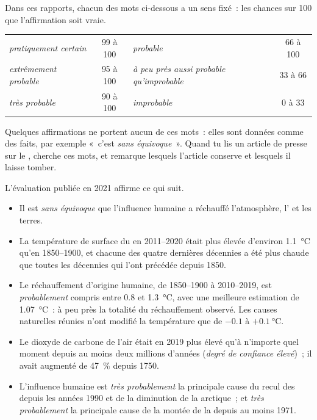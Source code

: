 Dans ces rapports, chacun des mots ci-dessous a un sens fixé~: les
chances sur 100 que l'affirmation soit vraie.

\begin{center}
{\small
\begin{tabular}{|l|c||l|c|}
\hline
\emph{pratiquement certain} & 99 à 100 & \emph{probable} & 66 à 100 \\
\emph{extrêmement probable} & 95 à 100 & \emph{à peu près aussi probable qu'improbable} & 33 à 66 \\
\emph{très probable} & 90 à 100 & \emph{improbable} & 0 à 33 \\
\hline
\end{tabular}}
\end{center}

\noindent Quelques affirmations ne portent aucun de ces mots~: elles sont
données comme des faits, par exemple «~c'est \emph{sans équivoque}~».
Quand tu lis un article de presse sur le , cherche ces mots, et
remarque lesquels l'article conserve et lesquels il laisse tomber.

L'évaluation publiée en 2021 affirme ce qui suit.
\begin{itemize}
  \item Il est \emph{sans équivoque} que l'influence humaine a réchauffé
        l'atmosphère, l' et les terres.
  \item La température de surface du  en 2011--2020 était plus élevée
        d'environ \qty{1.1}{\degreeCelsius} qu'en 1850--1900, et chacune
        des quatre dernières décennies a été plus chaude que toutes les
        décennies qui l'ont précédée depuis 1850.
  \item Le réchauffement d'origine humaine, de 1850--1900 à 2010--2019, est
        \emph{probablement} compris entre 0.8 et \qty{1.3}{\degreeCelsius},
        avec une meilleure estimation de \qty{1.07}{\degreeCelsius}~:
        à peu près la totalité du réchauffement observé. Les causes
        naturelles réunies n'ont modifié la température que de
        $-0.1$ à $+\qty{0.1}{\degreeCelsius}$.
  \item Le dioxyde de carbone de l'air était en 2019 plus élevé qu'à
        n'importe quel moment depuis au moins deux millions d'années
        (\emph{degré de confiance élevé})~; il avait augmenté de 47~\%
        depuis 1750.
  \item L'influence humaine est \emph{très probablement} la principale
        cause du recul des  depuis les années 1990 et de la
        diminution de la  arctique~; et \emph{très probablement} la
        principale cause de la montée de la  depuis au moins 1971.
\end{itemize}

